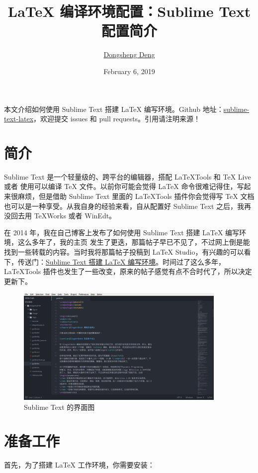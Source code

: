 \documentclass{article}
\title{\bfseries \LaTeX{} 编译环境配置：Sublime Text 配置简介}
\author{\href{https://ddswhu.me/}{Dongsheng Deng}}
\date{February 6, 2019}
\begin{document}
\maketitle

本文介绍如何使用 Sublime Text 搭建 \LaTeX{} 编写环境。Github 地址：\href{https://github.com/EthanDeng/sublime-text-latex}{sublime-text-latex}，欢迎提交 issues 和 pull requests。引用请注明来源！

\section{简介}
Sublime Text 是一个轻量级的、跨平台的编辑器，搭配 LaTeXTools 和 \TeX{} Live 或者 \MiKTeX 使用可以编译 \TeX{} 文件。以前你可能会觉得 LaTeX 命令很难记得住，写起来很麻烦，但是借助 Sublime Text 里面的 LaTeXTools 插件你会觉得写 \TeX{} 文档也可以是一种享受。从我自身的经验来看，自从配置好 Sublime Text 之后，我再没回去用 \TeX{}Works 或者 WinEdt。

在 2014 年，我在自己博客上发布了如何使用 Sublime Text 搭建 \LaTeX{} 编写环境，这么多年了，我的主页 发生了更迭，那篇帖子早已不见了，不过网上倒是能找到一些转载的内容。当时我将那篇帖子投稿到 \LaTeX{} Studio，有兴趣的可以看下，传送门：\href{http://www.latexstudio.net/archives/1169.html}{Sublime Text 搭建 LaTeX 编写环境}。时间过了这么多年，LaTeXTools 插件也发生了一些改变，原来的帖子感觉有点不合时代了，所以决定更新下。

\begin{figure}[htbp]
  \centering
  \includegraphics[width=0.9\textwidth]{sublime.png}
  \caption{Sublime Text 的界面图}
  \label{fig:sublime}
\end{figure}



\section{准备工作}
首先，为了搭建 \LaTeX{} 工作环境，你需要安装：
\end{document}
